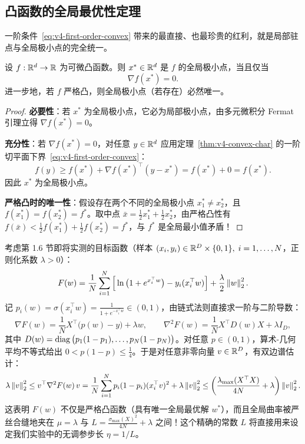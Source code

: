 \subsection{凸函数的全局最优性定理}

一阶条件~\eqref{eq:v4-first-order-convex} 带来的最直接、也最珍贵的红利，就是局部驻点与全局极小点的完全统一。

\begin{thmBox}
\begin{theorem}[凸函数驻点的全局最优性]\label{thm:v4-global-opt}
设 $f: \mathbb{R}^d \to \mathbb{R}$ 为可微凸函数。则 $x^* \in \mathbb{R}^d$ 是 $f$ 的全局极小点，当且仅当
\[
  \nabla f(x^*) = 0.
\]
进一步地，若 $f$ 严格凸，则全局极小点（若存在）必然唯一。
\end{theorem}
\end{thmBox}

\begin{proof}
\textbf{必要性}：若 $x^*$ 为全局极小点，它必为局部极小点，由多元微积分 Fermat 引理立得 $\nabla f(x^*) = 0$。

\textbf{充分性}：若 $\nabla f(x^*) = 0$，对任意 $y \in \mathbb{R}^d$ 应用定理~\ref{thm:v4-convex-char} 的一阶切平面下界~\eqref{eq:v4-first-order-convex}：
\[
  f(y) \ge f(x^*) + \nabla f(x^*)^\top (y - x^*) = f(x^*) + 0 = f(x^*).
\]
因此 $x^*$ 为全局极小点。

\textbf{严格凸时的唯一性}：假设存在两个不同的全局极小点 $x_1^* \neq x_2^*$，且 $f(x_1^*) = f(x_2^*) = f^*$。取中点 $\bar{x} = \frac{1}{2}x_1^* + \frac{1}{2}x_2^*$，由严格凸性有 $f(\bar{x}) < \frac{1}{2}f(x_1^*) + \frac{1}{2}f(x_2^*) = f^*$，与 $f^*$ 是全局最小值矛盾！
\end{proof}

\begin{example}[$L_2$ 正则化逻辑回归的精确海森矩阵与曲率界]\label{ex:v4-ch1-logreg}
考虑第 1.6 节即将实测的目标函数（样本 $(x_i, y_i) \in \mathbb{R}^D \times \{0, 1\},\; i=1,\dots,N$，正则化系数 $\lambda > 0$）：
\[
  F(w) = \frac{1}{N}\sum_{i=1}^N \Big[\ln\big(1 + e^{x_i^\top w}\big) - y_i (x_i^\top w)\Big] + \frac{\lambda}{2}\left\|w\right\|_2^2.
\]
记 $p_i(w) = \sigma(x_i^\top w) = \frac{1}{1+e^{-x_i^\top w}} \in (0, 1)$，由链式法则直接求一阶与二阶导数：
\[
  \nabla F(w) = \frac{1}{N}X^\top \big(p(w) - y\big) + \lambda w, \qquad
  \nabla^2 F(w) = \frac{1}{N}X^\top D(w) X + \lambda I_D,
\]
其中 $D(w) = \operatorname{diag}\big(p_1(1-p_1), \dots, p_N(1-p_N)\big)$。对任意 $p \in (0, 1)$，算术-几何平均不等式给出 $0 < p(1-p) \le \frac{1}{4}$。于是对任意非零向量 $v \in \mathbb{R}^D$，有双边谱估计：
\[
  \lambda \left\|v\right\|_2^2 \le v^\top \nabla^2 F(w)\, v = \frac{1}{N}\sum_{i=1}^N p_i(1-p_i)(x_i^\top v)^2 + \lambda\left\|v\right\|_2^2 \le \left(\frac{\lambda_{\max}(X^\top X)}{4N} + \lambda\right)\left\|v\right\|_2^2.
\]
这表明 $F(w)$ 不仅是严格凸函数（具有唯一全局最优解 $w^*$），而且全局曲率被严丝合缝地夹在 $\mu = \lambda$ 与 $L = \frac{\sigma_{\max}(X)^2}{4N} + \lambda$ 之间！这个精确的常数 $L$ 将直接用来设定我们实验中的无调参步长 $\eta = 1/L$。
\end{example}

